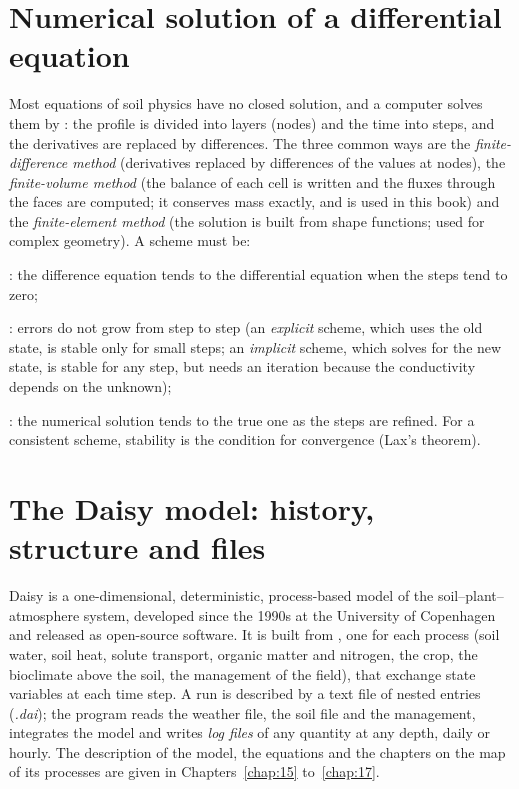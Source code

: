 \section{Numerical solution of a differential equation}
Most equations of soil physics have no closed solution, and a computer solves them by : the profile is divided into layers (nodes) and the time into steps, and the derivatives are replaced by differences. The three common ways are the \emph{finite-difference method} (derivatives replaced by differences of the values at nodes), the \emph{finite-volume method} (the balance of each cell is written and the fluxes through the faces are computed; it conserves mass exactly, and is used in this book) and the \emph{finite-element method} (the solution is built from shape functions; used for complex geometry). A scheme must be:
\begin{exlist}
\item {}: the difference equation tends to the differential equation when the steps tend to zero;
\item {}: errors do not grow from step to step (an \emph{explicit} scheme, which uses the old state, is stable only for small steps; an \emph{implicit} scheme, which solves for the new state, is stable for any step, but needs an iteration because the conductivity depends on the unknown);
\item {}: the numerical solution tends to the true one as the steps are refined. For a consistent scheme, stability is the condition for convergence (Lax's theorem).
\end{exlist}

\section{The Daisy model: history, structure and files}
Daisy is a one-dimensional, deterministic, process-based model of the soil--plant--atmosphere system, developed since the 1990s at the University of Copenhagen and released as open-source software. It is built from , one for each process (soil water, soil heat, solute transport, organic matter and nitrogen, the crop, the bioclimate above the soil, the management of the field), that exchange state variables at each time step. A run is described by a text file of nested entries (\emph{.dai}); the program reads the weather file, the soil file and the management, integrates the model and writes \emph{log files} of any quantity at any depth, daily or hourly. The description of the model, the equations and the chapters on the map of its processes are given in Chapters~\ref{chap:15} to~\ref{chap:17}.

